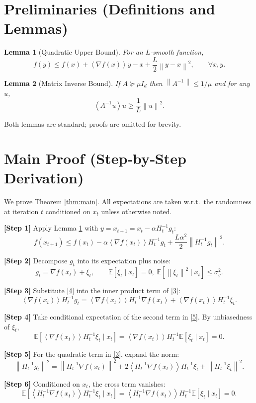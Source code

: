 \documentclass{article}
\newtheorem{lemma}{Lemma}
\newcommand{\EE}{\mathbb{E}}
\newcommand{\norm}[1]{\left\|#1\right\|}
\newcommand{\inner}[1]{\left\langle #1 \right\rangle}
\begin{document}
\section*{Preliminaries (Definitions and Lemmas)}
\begin{lemma}[Quadratic Upper Bound]\label{lem:quad}
For an $L$‑smooth function,
\[
f(y)\le f(x)+\inner{\nabla f(x)}{y-x}+\frac{L}{2}\norm{y-x}^{2},\qquad\forall x,y.
\]
\end{lemma}
\begin{lemma}[Matrix Inverse Bound]\label{lem:inv}
If $A\succeq \mu I_d$ then $\norm{A^{-1}}\le 1/\mu$ and for any $u$,
\[
\inner{A^{-1}u}{u}\ge \frac{1}{L}\norm{u}^{2}.
\]
\end{lemma}
Both lemmas are standard; proofs are omitted for brevity.

\section*{Main Proof (Step‑by‑Step Derivation)}
We prove Theorem \ref{thm:main}. All expectations are taken w.r.t.\ the randomness at iteration $t$ conditioned on $x_t$ unless otherwise noted.

\noindent\textbf{[Step 1]} Apply Lemma \ref{lem:quad} with $y=x_{t+1}=x_t-\alpha H_t^{-1}g_t$:
\[
f(x_{t+1})\le f(x_t)-\alpha\inner{ \nabla f(x_t)}{H_t^{-1}g_t}
+\frac{L\alpha^{2}}{2}\norm{H_t^{-1}g_t}^{2}. \tag{3}
\]

\noindent\textbf{[Step 2]} Decompose $g_t$ into its expectation plus noise:
\[
g_t=\nabla f(x_t)+\xi_t,\qquad \EE[\xi_t\mid x_t]=0,\;
\EE[\norm{\xi_t}^{2}\mid x_t]\le\sigma_g^{2}. \tag{4}
\]

\noindent\textbf{[Step 3]} Substitute \eqref{4} into the inner product term of \eqref{3}:
\[
\inner{\nabla f(x_t)}{H_t^{-1}g_t}
= \inner{\nabla f(x_t)}{H_t^{-1}\nabla f(x_t)}
+ \inner{\nabla f(x_t)}{H_t^{-1}\xi_t}. \tag{5}
\]

\noindent\textbf{[Step 4]} Take conditional expectation of the second term in \eqref{5}. By unbiasedness of $\xi_t$,
\[
\EE\!\left[\inner{\nabla f(x_t)}{H_t^{-1}\xi_t}\mid x_t\right]=
\inner{\nabla f(x_t)}{H_t^{-1}\EE[\xi_t\mid x_t]}=0. \tag{6}
\]

\noindent\textbf{[Step 5]} For the quadratic term in \eqref{3}, expand the norm:
\[
\norm{H_t^{-1}g_t}^{2}
= \norm{H_t^{-1}\nabla f(x_t)}^{2}
+2\inner{H_t^{-1}\nabla f(x_t)}{H_t^{-1}\xi_t}
+\norm{H_t^{-1}\xi_t}^{2}. \tag{7}
\]

\noumber\textbf{[Step 6]} Conditioned on $x_t$, the cross term vanishes:
\[
\EE\!\left[\inner{H_t^{-1}\nabla f(x_t)}{H_t^{-1}\xi_t}\mid x_t\right]=
\inner{H_t^{-1}\nabla f(x_t)}{H_t^{-1}\EE[\xi_t\mid x_t]}=0. \tag{8}
\]
\end{document}
